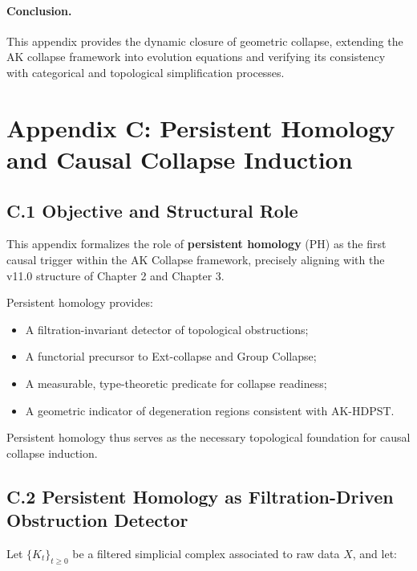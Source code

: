 \documentclass[11pt]{article}
\begin{document}
\paragraph{Conclusion.} This appendix provides the dynamic closure of geometric collapse, extending the AK collapse framework into evolution equations and verifying its consistency with categorical and topological simplification processes.



\section*{Appendix C: Persistent Homology and Causal Collapse Induction}

\subsection*{C.1 Objective and Structural Role}

This appendix formalizes the role of \textbf{persistent homology} (PH) as the first causal trigger within the AK Collapse framework, precisely aligning with the v11.0 structure of Chapter 2 and Chapter 3.

Persistent homology provides:

\begin{itemize}
    \item A filtration-invariant detector of topological obstructions;
    \item A functorial precursor to Ext-collapse and Group Collapse;
    \item A measurable, type-theoretic predicate for collapse readiness;
    \item A geometric indicator of degeneration regions consistent with AK-HDPST.
\end{itemize}

Persistent homology thus serves as the necessary topological foundation for causal collapse induction.

\subsection*{C.2 Persistent Homology as Filtration-Driven Obstruction Detector}

Let \( \{ K_t \}_{t \geq 0} \) be a filtered simplicial complex associated to raw data \( X \), and let:
\end{document}
